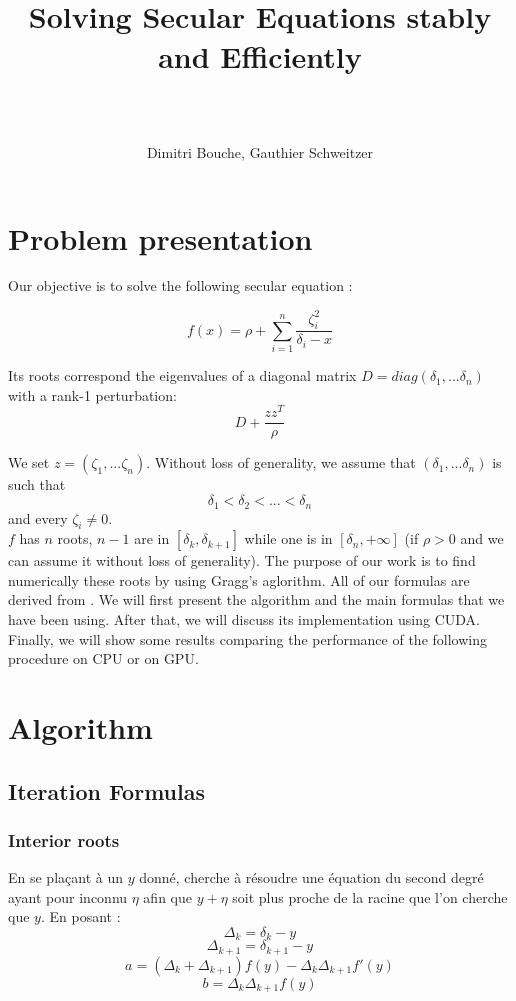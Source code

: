 \documentclass[10pt,a4paper]{article}
\title{	
\normalfont \normalsize 
\horrule{0.5pt} \\[0.4cm] %
\huge {Solving Secular Equations stably and Efficiently} \\ %
\horrule{2pt} \\[0.5cm] %
\date{\vspace{-5ex}}
}
\author{Dimitri Bouche, Gauthier Schweitzer} %
\begin{document}
\maketitle

\section{Problem presentation}
Our objective is to solve the following secular equation :

\begin{equation}
\label{secular}
f(x) = \rho + \sum_{i=1}^n \frac{\zeta_i^2}{\delta_i - x}
\end{equation}

Its roots correspond the eigenvalues of a diagonal matrix $D = diag(\delta_1,...\delta_n) $ with a rank-1 perturbation:
$$ D + \frac{zz^T}{\rho}$$

We set $z = (\zeta_1,...\zeta_n)$. Without loss of generality, we assume that $(\delta_1,...\delta_n)$ is such that $$\delta_1<\delta_2<...<\delta_n$$ and every $\zeta_i \neq 0$. \\

$f$ has $n$ roots, $n - 1$ are in $[\delta_k, \delta_{k+1}]$ while one is in $[\delta_n, + \infty]$ (if $\rho >0$ and we can assume it without loss of generality). The purpose of our work is to find numerically these roots by using Gragg's aglorithm. All of our formulas are derived from \cite{1}.
We will first present the algorithm and the main formulas that we have been using. After that, we will discuss its implementation using CUDA. Finally, we will show some results comparing the performance of the following procedure on CPU or on GPU.


\section{Algorithm}

\subsection{Iteration Formulas}
\subsubsection{Interior roots}
En se plaçant à un $y$ donné, cherche à résoudre une équation du second degré ayant pour inconnu $\eta$ afin que $y + \eta$ soit plus proche de la racine que l'on cherche que $y$. 
En posant : 
$$ \Delta_k = \delta_k - y$$ 
$$ \Delta_ {k+1} = \delta_{k+1} - y$$ 
$$ a = (\Delta_k + \Delta_{k+1}) f(y) - \Delta_k \Delta_{k+1}f'(y)$$
$$ b = \Delta_k \Delta_{k+1} f(y)$$
\end{document}
